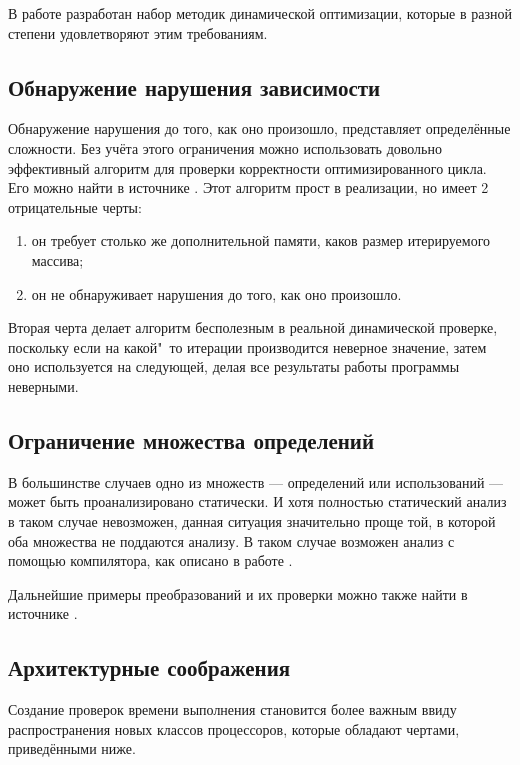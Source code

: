 В работе \cite{ZuckPFGH02} разработан набор методик динамической оптимизации, которые в разной степени удовлетворяют этим требованиям.

\subsection{Обнаружение нарушения зависимости}

Обнаружение нарушения до того, как оно произошло, представляет определённые сложности. Без учёта этого ограничения можно использовать довольно эффективный алгоритм для проверки корректности оптимизированного цикла. Его можно найти в источнике \cite{ZuckPFGH02}. Этот алгоритм прост в реализации, но имеет 2 отрицательные черты:

\begin{enumerate}
	\item он требует столько же дополнительной памяти, каков размер итерируемого массива;
	\item он не обнаруживает нарушения до того, как оно произошло.
\end{enumerate}

Вторая черта делает алгоритм бесполезным в реальной динамической проверке, поскольку если на какой"~то итерации производится неверное значение, затем оно используется на следующей, делая все результаты работы программы неверными.

\subsection{Ограничение множества определений}

В большинстве случаев одно из множеств --- определений или использований --- может быть проанализировано статически. И хотя полностью статический анализ в таком случае невозможен, данная ситуация значительно проще той, в которой оба множества не поддаются анализу. В таком случае возможен анализ с помощью компилятора, как описано в работе \cite{ZuckPFGH02}.

Дальнейшие примеры преобразований и их проверки можно также найти в источнике \cite{ZuckPFGH02}.

\subsection{Архитектурные соображения}

Создание проверок времени выполнения становится более важным ввиду распространения новых классов процессоров, которые обладают чертами, приведёнными ниже.

